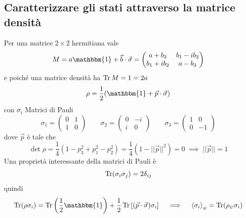 \subsection{Caratterizzare gli stati attraverso la matrice densità}
Per una matrice \(2 \times 2\) hermitiana vale
\[
M = a \mathbbm{1} + \vec{b} \cdot \vec{\sigma} = \begin{pmatrix}
a + b_3 & b_1 - ib_2 \\
b_1 + ib_2 & a - b_3
\end{pmatrix}
\]
e poiché una matrice densità ha \(\operatorname{Tr} M = 1 = 2a\)
\[
\rho = \frac{1}{2} (\mathbbm{1} + \vec{p} \cdot \vec{\sigma})
\]
con \(\sigma_i\) Matrici di Pauli
\[
\sigma_1 = \begin{pmatrix}
0 & 1 \\
1 & 0
\end{pmatrix} \qquad
\sigma_2 = \begin{pmatrix}
0 & -i \\
i & 0
\end{pmatrix} \qquad
\sigma_3 = \begin{pmatrix}
1 & 0 \\
0 & -1
\end{pmatrix}
\]
dove \(\vec{p}\) è tale che
\[
\det \rho = \frac{1}{4} (1 - p_3^2 + p_1^2 -p_2^2) = \frac{1}{4} (1 - ||\vec{p}||^2) = 0 \; \implies \;  ||\vec{p}|| = 1
\]
Una proprietà interessante della matrici di Pauli è
\[
\operatorname{Tr}(\sigma_i \sigma_j) = 2 \delta_{ij}
\]
quindi
\[
\Tr(\rho \sigma_i) = \Tr \left( \frac{1}{2} \mathbbm{1} \right) + \frac{1}{2} \Tr \left[ (\vec{p} \cdot \vec{\sigma}) \sigma_i \right] \quad \implies \quad \braket{\sigma_i}_\psi = \Tr(\rho_\psi \sigma_i)
\]